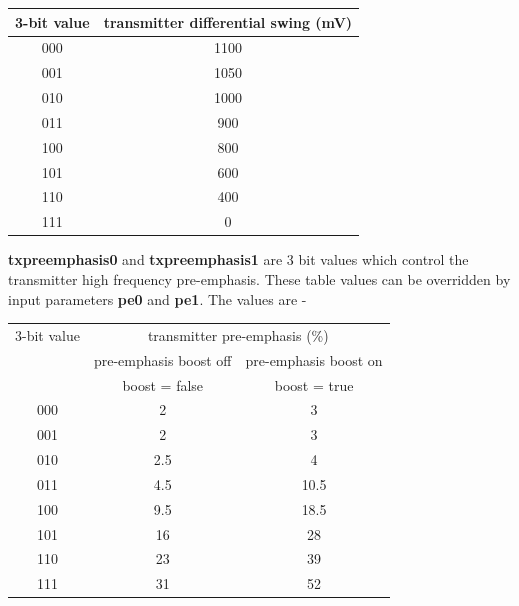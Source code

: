             \begin{tabular}{| c | c |}
            \hline
            3-bit value      & transmitter differential swing (mV)  \\
            \hline
            \hline
            000 & 1100 \\
            \hline
            001 & 1050 \\
            \hline
            010 & 1000 \\
            \hline
            011 & 900 \\
            \hline
            100 & 800 \\
            \hline
            101 & 600 \\
            \hline
            110 & 400 \\
            \hline
            111 & 0 \\
            \hline
            \end{tabular}

            {\bf txpreemphasis0} and {\bf txpreemphasis1} are 3 bit values which
            control the transmitter high frequency pre-emphasis. These table
            values can be overridden by input parameters {\bf pe0} and {\bf
            pe1}. The values are -
            
            \begin{tabular}{| c | c | c |}
            \hline
            3-bit value & \multicolumn{2}{c|}{transmitter pre-emphasis (\%)} \\
                        & pre-emphasis boost off & pre-emphasis boost on \\
                        & boost = false & boost = true \\
            \hline
            \hline
            000 & 2 & 3 \\
            \hline
            001 & 2 & 3 \\
            \hline
            010 & 2.5 & 4 \\
            \hline
            011 & 4.5 & 10.5 \\
            \hline
            100 & 9.5 & 18.5 \\
            \hline
            101 & 16 & 28 \\
            \hline
            110 & 23 & 39 \\
            \hline
            111 & 31 & 52 \\
            \hline
            \end{tabular}
            
